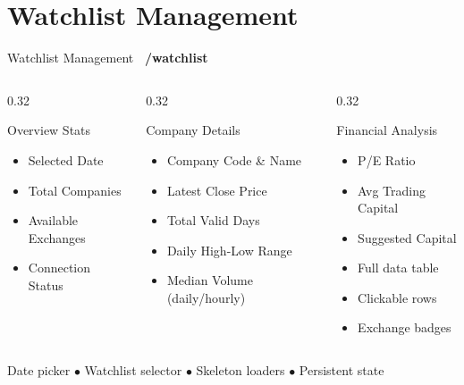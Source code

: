 \documentclass[aspectratio=169, 11pt]{beamer}
\newcommand{\tagbox}[2]{\colorbox{#1}{\scriptsize\color{white}\textbf{~#2~}}}
\begin{document}
\section{Watchlist Management}
\begin{frame}{Watchlist Management \hfill \tagbox{accentgreen}{/watchlist}}
\begin{columns}[T]
\begin{column}{0.32\textwidth}
\begin{block}{Overview Stats}
\begin{itemize}
  \item Selected Date
  \item Total Companies
  \item Available Exchanges
  \item Connection Status
\end{itemize}
\end{block}
\end{column}
\begin{column}{0.32\textwidth}
\begin{block}{Company Details}
\begin{itemize}
  \item Company Code \& Name
  \item Latest Close Price
  \item Total Valid Days
  \item Daily High-Low Range
  \item Median Volume (daily/hourly)
\end{itemize}
\end{block}
\end{column}
\begin{column}{0.32\textwidth}
\begin{block}{Financial Analysis}
\begin{itemize}
  \item P/E Ratio
  \item Avg Trading Capital
  \item Suggested Capital
  \item Full data table
  \item Clickable rows
  \item Exchange badges
\end{itemize}
\end{block}
\end{column}
\end{columns}
\vfill
\centering
\small Date picker $\bullet$ Watchlist selector $\bullet$ Skeleton loaders $\bullet$ Persistent state
\end{frame}
\end{document}
